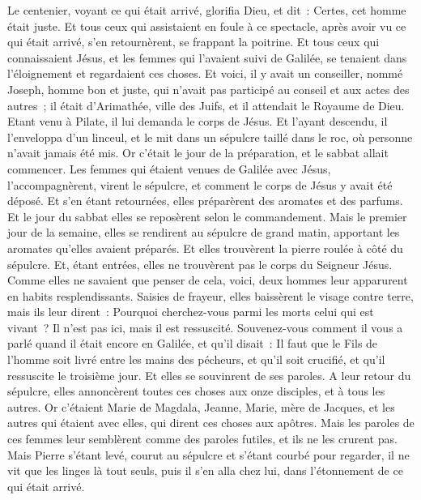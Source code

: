 \begin{multicols}{2}
Le centenier, voyant ce qui était arrivé, glorifia Dieu, et dit~: Certes, cet homme était juste.
Et tous ceux qui assistaient en foule à ce spectacle, après avoir vu ce qui était arrivé, s'en retournèrent, se frappant la poitrine.
Et tous ceux qui connaissaient Jésus, et les femmes qui l'avaient suivi de Galilée, se tenaient dans l'éloignement et regardaient ces choses.
Et voici, il y avait un conseiller, nommé Joseph, homme bon et juste,
qui n'avait pas participé au conseil et aux actes des autres~; il était d'Arimathée, ville des Juifs, et il attendait le Royaume de Dieu.
Etant venu à Pilate, il lui demanda le corps de Jésus.
Et l'ayant descendu, il l'enveloppa d'un linceul, et le mit dans un sépulcre taillé dans le roc, où personne n'avait jamais été mis.
Or c'était le jour de la préparation, et le sabbat allait commencer.
Les femmes qui étaient venues de Galilée avec Jésus, l'accompagnèrent, virent le sépulcre, et comment le corps de Jésus y avait été déposé.
Et s'en étant retournées, elles préparèrent des aromates et des parfums. Et le jour du sabbat elles se reposèrent selon le commandement.
\VerseOne{}Mais le premier jour de la semaine, elles se rendirent au sépulcre de grand matin, apportant les aromates qu'elles avaient préparés.
Et elles trouvèrent la pierre roulée à côté du sépulcre.
Et, étant entrées, elles ne trouvèrent pas le corps du Seigneur Jésus.
Comme elles ne savaient que penser de cela, voici, deux hommes leur apparurent en habits resplendissants.
Saisies de frayeur, elles baissèrent le visage contre terre, mais ils leur dirent~: Pourquoi cherchez-vous parmi les morts celui qui est vivant~?
Il n'est pas ici, mais il est ressuscité. Souvenez-vous comment il vous a parlé quand il était encore en Galilée,
et qu'il disait~: Il faut que le Fils de l'homme soit livré entre les mains des pécheurs, et qu'il soit crucifié, et qu'il ressuscite le troisième jour.
Et elles se souvinrent de ses paroles.
A leur retour du sépulcre, elles annoncèrent toutes ces choses aux onze disciples, et à tous les autres.
Or c'étaient Marie de Magdala, Jeanne, Marie, mère de Jacques, et les autres qui étaient avec elles, qui dirent ces choses aux apôtres.
Mais les paroles de ces femmes leur semblèrent comme des paroles futiles, et ils ne les crurent pas.
Mais Pierre s'étant levé, courut au sépulcre et s'étant courbé pour regarder, il ne vit que les linges là tout seuls, puis il s'en alla chez lui, dans l'étonnement de ce qui était arrivé.

\end{multicols}
